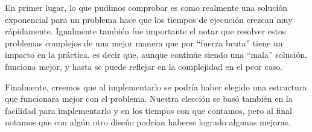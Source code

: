 En primer lugar, lo que pudimos comprobar es como realmente una solución exponencial para un problema hace que los tiempos de ejecución crezcan muy rápidamente. Igualmente también fue importante el notar que resolver estos problemas complejos de una mejor manera que por ``fuerza bruta'' tiene un impacto en la práctica, es decir que, aunque continúe siendo una ``mala'' solución, funciona mejor, y hasta se puede reflejar en la complejidad en el peor caso.

Finalmente, creemos que al implementarlo se podría haber elegido una estructura que funcionara mejor con el problema. Nuestra elección se basó también en la facilidad para implementarlo y en los tiempos con que contamos, pero al final notamos que con algún otro diseño podrían haberse logrado algunas mejoras.